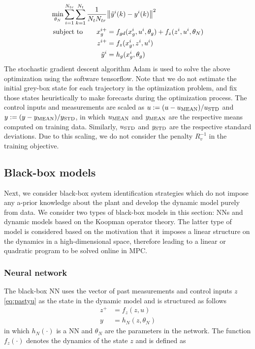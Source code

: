 \documentclass[10pt]{article}
\begin{document}
\begin{align} \label{eq:hybrid_training}
  \underset{\theta_N}{\textnormal{min}} \sum_{i=1}^{N_{tr}} \sum_{k=1}^{N_t} 
  \dfrac{1}{N_tN_{tr}} &\norm{\tilde{y}^i(k) - y^i(k)}^2  \\
  \textnormal{subject to} \quad \quad x_g^{i+} &= f_{gd}(x_g^i, u^i, \theta_g) + f_z(z^i, u^i, \theta_N) \nonumber \\
  z^{i+} &= f_z(x_g^i, z^i, u^i) \nonumber \\
   \tilde{y}^i &= h_g(x_g^i, \theta_g) \nonumber
\end{align}
The stochastic gradient descent algorithm Adam is used to solve the above optimization using the software tensorflow. Note that we do not estimate the initial grey-box state for each trajectory in the optimization problem, and fix those states heuristically to make forecasts during the optimization process. The control inputs and measurements are scaled as $u := (u - u_{\textnormal{MEAN}})/u_{\textnormal{STD}}$ and 
$y := (y - y_{\textnormal{MEAN}})/y_{\textnormal{STD}}$, in which $u_{\textnormal{MEAN}}$ and $y_{\textnormal{MEAN}}$ are the respective means computed on training data. Similarly, $u_{\textnormal{STD}}$ and $y_{\textnormal{STD}}$ are the respective standard deviations. Due to this scaling, we do not consider the penalty $R_v^{-1}$ in the training objective.

\subsection{Black-box models}
Next, we consider black-box system identification strategies which do not impose any a-prior knowledge about the plant and develop the dynamic model purely from data. We consider two types of black-box models in this section: NNs and dynamic models based on the Koopman operator theory. The latter type of model is considered based on the motivation that it imposes a linear structure on the dynamics in a high-dimensional space, therefore leading to a linear or quadratic program to be solved online in MPC.

\subsubsection{Neural network}
The black-box NN uses the vector of past measurements and control inputs $z$ \eqref{eq:pastyu} as the state in the dynamic model and is structured as follows
\begin{align} \label{eq:bbnn_model}
  z^+ &= f_z(z, u) \\ 
  y &= h_N(z, \theta_N) \nonumber
\end{align}
in which $h_N(\cdot)$ is a NN and $\theta_N$ are the parameters in the network. The function $f_z(\cdot)$ denotes the dynamics of the state $z$ and is defined as 
\end{document}
